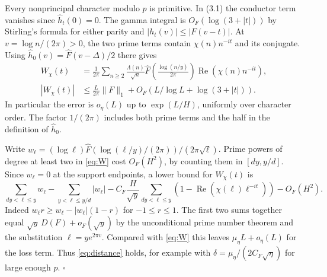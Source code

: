 \documentclass[11pt]{article}
\newcommand{\re}{\operatorname{Re}}
\begin{document}
Every nonprincipal character modulo \(p\) is primitive. In (3.1) the
conductor term vanishes since \(\widehat h_t(0)=0\). The gamma integral
is \(O_F(\log(3+|t|))\) by Stirling's formula for either parity and
\(|h_t(v)|\le |F(v-t)|\). At \(v=\log n/(2\pi)>0\), the two prime
terms contain \(\chi(n)n^{-it}\) and its conjugate. Using
\(\widehat h_0(v)=\widehat F(v-\Delta)/2\) there gives
\begin{align}
 W_\chi(t)&=\frac1{2\pi}\sum_{n\ge2}\frac{\Lambda(n)}{\sqrt n}
    \widehat F\!\left(\frac{\log(n/y)}{2\pi}\right)
    \re(\chi(n)n^{-it}),\nonumber\\
 |W_\chi(t)|&\le\frac{L}{2\pi}\|F\|_1+
 O_F\!\left(L/\log L+\log(3+|t|)\right).\label{eq:W}
\end{align}
In particular the error is \(o_\eta(L)\) up to \(\exp(L/H)\), uniformly
over character order. The factor \(1/(2\pi)\) includes both prime
terms and the half in the definition of \(\widehat h_0\).

Write \(w_\ell=(\log\ell)\widehat F(\log(\ell/y)/(2\pi))/
(2\pi\sqrt\ell)\). Prime powers of degree at least two in
\eqref{eq:W} cost \(O_F(H^2)\), by counting them in \([dy,y/d]\).
Since \(w_\ell=0\) at the support endpoints, a lower bound for \(W_\chi(t)\)
is
\[
 \sum_{dy<\ell\le y} w_\ell-\sum_{y<\ell\le y/d}|w_\ell|
 - C_F\frac{H}{\sqrt y}
       \sum_{dy<\ell\le y}(1-\re(\chi(\ell)\ell^{-it}))-O_F(H^2).
\]
Indeed \(w_\ell r\ge w_\ell-|w_\ell|(1-r)\) for \(-1\le r\le1\).
The first two sums together equal \(\sqrt y\,D(F)+o_F(\sqrt y)\) by
the unconditional prime number theorem and the substitution \(\ell=ye^{2\pi v}\).
Compared with \eqref{eq:W} this leaves \(\mu_\eta L+o_\eta(L)\) for
the loss term. Thus \eqref{eq:distance} holds, for example with
\(\delta=\mu_\eta/(2C_F\sqrt\eta)\) for large enough \(p\).
\hfill\(\square\)
\end{document}
